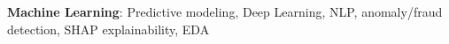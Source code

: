 \item \textbf{Machine Learning}: Predictive modeling, Deep Learning, NLP, anomaly/fraud detection, SHAP explainability, EDA
